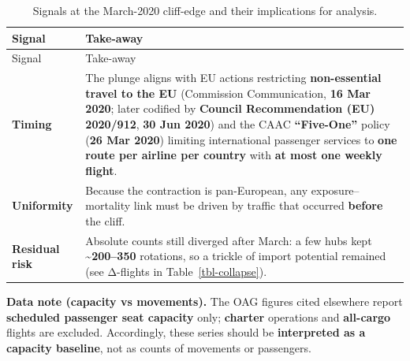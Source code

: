 \documentclass[
  authoryear,
  preprint,
  3p,
  onecolumn]{elsarticle}
\begin{document}
\begin{longtable}[]{@{}
  >{\raggedright\arraybackslash}p{}
  >{\raggedright\arraybackslash}p{}@{}}
\caption{Signals at the March-2020 cliff-edge and their implications for
analysis.}\label{tbl-cliff-signals}\tabularnewline
\toprule\noalign{}
\begin{minipage}[b]{\linewidth}\raggedright
Signal
\end{minipage} & \begin{minipage}[b]{\linewidth}\raggedright
Take-away
\end{minipage} \\
\midrule\noalign{}
\endfirsthead
\toprule\noalign{}
\begin{minipage}[b]{\linewidth}\raggedright
Signal
\end{minipage} & \begin{minipage}[b]{\linewidth}\raggedright
Take-away
\end{minipage} \\
\midrule\noalign{}
\endhead
\bottomrule\noalign{}
\endlastfoot
\textbf{Timing} & The plunge aligns with EU actions restricting
\textbf{non-essential travel to the EU} (Commission Communication,
\textbf{16 Mar 2020}; later codified by \textbf{Council Recommendation
(EU) 2020/912}, \textbf{30 Jun 2020}) and the CAAC \textbf{``Five-One''}
policy (\textbf{26 Mar 2020}) limiting international passenger services
to \textbf{one route per airline per country} with \textbf{at most one
weekly flight}.
\citep{eu-comm-2020-travel, eu-council-2020-912, CAAC2020} \\
\textbf{Uniformity} & Because the contraction is pan-European, any
exposure--mortality link must be driven by traffic that occurred
\textbf{before} the cliff. \\
\textbf{Residual risk} & Absolute counts still diverged after March: a
few hubs kept \textbf{\textasciitilde200--350} rotations, so a trickle
of import potential remained (see Δ-flights in
Table~\ref{tbl-collapse}). \\
\end{longtable}

\textbf{Data note (capacity vs movements).} The OAG figures cited
elsewhere report \textbf{scheduled passenger seat capacity} only;
\textbf{charter} operations and \textbf{all-cargo} flights are excluded.
Accordingly, these series should be \textbf{interpreted as a capacity
baseline}, not as counts of movements or passengers.
\citep{warnocksmith2021}
\end{document}
